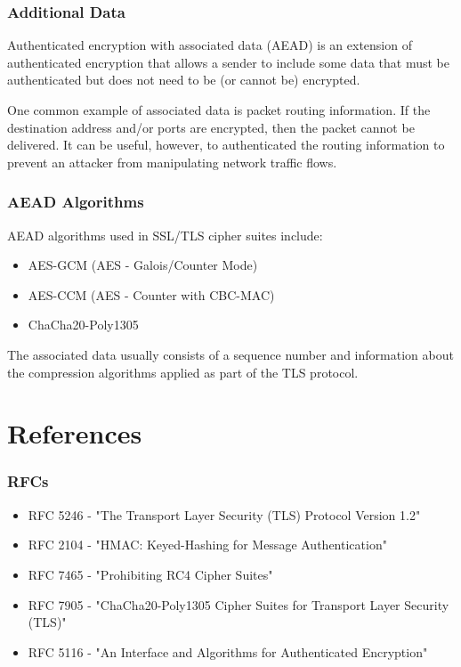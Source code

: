 \documentclass[aspectratio=169]{beamer}
\begin{document}
\begin{frame}
	\frametitle{Additional Data}
	Authenticated encryption with associated data (AEAD) is an extension of authenticated encryption that allows a sender to include some data that must be authenticated but does not need to be (or cannot be) encrypted.
	
	\vfill
	
	One common example of associated data is packet routing information.  If the destination address and/or ports are encrypted, then the packet cannot be delivered.  It can be useful, however, to authenticated the routing information to prevent an attacker from manipulating network traffic flows.
\end{frame}

\begin{frame}
	\frametitle{AEAD Algorithms}
	AEAD algorithms used in SSL/TLS cipher suites include:
	\begin{itemize}
		\item AES-GCM (AES - Galois/Counter Mode)
		\item AES-CCM (AES - Counter with CBC-MAC)
		\item ChaCha20-Poly1305
	\end{itemize}

	\vfill
	
	The associated data usually consists of a sequence number and information about the compression algorithms applied as part of the TLS protocol.
\end{frame}

\section{References}
\begin{frame}[Roundel=siiorange]
	\tocpage
\end{frame}

\begin{frame}
	\frametitle{RFCs}
	\begin{itemize}
		\item RFC 5246 - "The Transport Layer Security (TLS) Protocol Version 1.2"
		
		\vfill
				
		\item RFC 2104 - "HMAC: Keyed-Hashing for Message Authentication"

		\vfill
				
		\item RFC 7465 - "Prohibiting RC4 Cipher Suites"

		\vfill
				
		\item RFC 7905 - "ChaCha20-Poly1305 Cipher Suites for Transport Layer Security (TLS)"

		\vfill
				
		\item RFC 5116 - "An Interface and Algorithms for Authenticated Encryption"
	\end{itemize}
\end{frame}
\end{document}
